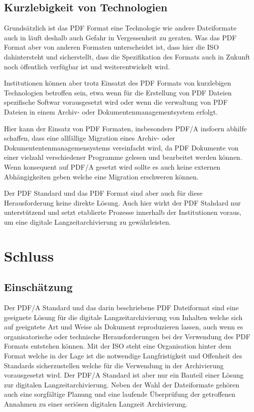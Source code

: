 \documentclass[a4paper,oneside, 12pt]{report}
\begin{document}
\section{Kurzlebigkeit von Technologien}
Grundsätzlich ist das PDF Format eine Technologie wie andere Dateiformate auch in läuft deshalb auch Gefahr in Vergessenheit zu geraten. Was das PDF Format aber von anderen Formaten unterscheidet ist, dass hier die \ac{ISO} dahintersteht und sicherstellt, dass die Spezifikation des Formats auch in Zukunft noch öffentlich verfügbar ist und weiterentwickelt wird. 

Institutionen können aber trotz Einsatzt des PDF Formats von kurzlebigen Technologien betroffen sein, etwa wenn für die Erstellung von PDF Dateien spezifische Softwar vorausgesetzt wird oder wenn die verwaltung von PDF Dateien in einem Archiv- oder Dokumentenmanagementsystem erfolgt.

Hier kann der Einsatz von PDF Formaten, insbesonders PDF/A insfoern abhilfe schaffen, dass eine allfällige Migration eines Archiv- oder Dokumententenmanagemensystems vereinfacht wird, da PDF Dokumente von einer vielzahl verschiedener Programme gelesen und bearbeitet werden können. Wenn konsequent auf PDF/A gesetzt wird sollte es auch keine externen Abhängigkeiten geben welche eine Migration erschweren können.

Der PDF Standard und das PDF Format sind aber auch für diese Herausforderung keine direkte Lösung. Auch hier wirkt der PDF Stahdard nur unterstützend und setzt etablierte Prozesse innerhalb der Institutionen voraus, um eine digitale Langzeitarchivierung zu gewährleisten.


\chapter{Schluss}\label{sec:schluss}
\section{Einschätzung}
Der PDF/A Standard und das darin beschriebene PDF Dateiformat sind eine geeignete Lösung für die digitale Langzeitarchivierung von Inhalten welche sich auf geeigntete Art und Weise als Dokument reproduzieren lassen, auch wenn es organisatorische oder technische Herausforderungen bei der Verwendung des PDF Formats entstehen können. Mit der \ac{ISO} steht eine Organisation hinter dem Format welche in der Lage ist die notwendige Langfristigkeit und Offenheit des Standards sicherzustellen welche für die Verwendung in der Archivierung vorausgesetzt wird. Der PDF/A Standard ist aber nur ein Bauteil einer Lösung zur digitalen Langzeitarchivierung. Neben der Wahl der Dateiformate gehören auch eine sorgfältige Planung und eine laufende Überprüfung der getroffenen Annahmen zu einer seriösen digitalen Langzeit Archivierung. 
\end{document}
